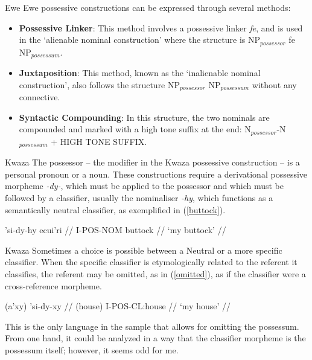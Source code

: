 \documentclass[12pt,aspectratio=169,t]{beamer}
\renewcommand{\'}{\textquotesingle}
\begin{document}
\begin{frame}{Ewe}
	Ewe possessive constructions can be expressed through several methods:
	
	\begin{itemize}
		\item \textbf{Possessive Linker}: This method involves a possessive linker \textit{fe}, and is used in the `alienable nominal construction' where the structure is NP$_{possessor}$ fe NP$_{possessum}$.
		\item \textbf{Juxtaposition}: This method, known as the `inalienable nominal construction', also follows the structure NP$_{possessor}$ NP$_{possessum}$ without any connective.
		
		\item \textbf{Syntactic Compounding}: In this structure, the two nominals are compounded and marked with a high tone suffix at the end: N$_{possessor}$-N$_{possessum}$ + HIGH TONE SUFFIX.
	\end{itemize}
	
\end{frame}


\begin{frame}{Kwaza}
	The possessor -- the modifier in the Kwaza possessive construction -- is a personal pronoun or a noun. These constructions require a derivational possessive morpheme \textit{-dy-}, which must be applied to the possessor and which must be followed by a classifier, usually the nominaliser \textit{-hy}, which functions as a semantically neutral classifier, as exemplified in (\ref{buttock}).
	
	\ex
	\begingl\label{buttock}
	\gla 'si-dy-hy ecui'ri //
	\glb I-POS-NOM buttock //
	\glft `my buttock' //
	\endgl
	\xe

\end{frame}

\begin{frame}{Kwaza}
	Sometimes a choice is possible between a Neutral or a more specific classifier. When the specific classifier is etymologically related to the referent it classifies, the referent may be omitted, as in (\ref{omitted}), as if the classifier were a cross-reference morpheme.
	
	\ex
	\begingl \label{omitted}
	\gla (a'xy) 'si-dy-xy //
	\glb (house) I-POS-CL:house //
	\glft `my house' //
	\endgl
	\xe
	
	This is the only language in the sample that allows for omitting the possessum. From one hand, it could be analyzed in a way that the classifier morpheme is the possessum itself; however, it seems odd for me.
\end{frame}
\end{document}
